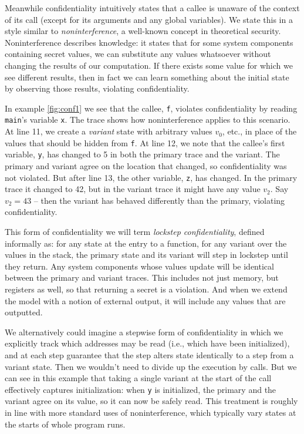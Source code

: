 \documentclass[acmsmall,review,anonymous]{acmart}\settopmatter{printfolios=true,printccs=false,printacmref=false}
\begin{document}
Meanwhile confidentiality intuitively states that a callee is unaware
of the context of its call (except for its arguments and any global variables).
We state this in a style similar to {\em noninterference}, a well-known concept in theoretical
security. Noninterference describes knowledge: it states that for some system components
containing secret values, we can substitute any values whatsoever without changing the results
of our computation. If there exists some value for which we see different results, then
in fact we can learn something about the initial state by observing those results, violating
confidentiality.

In example \ref{fig:conf1} we see that the callee, {\tt f}, violates confidentiality
by reading {\tt main}'s variable {\tt x}. The trace
shows how noninterference applies to this scenario. At line 11, we create a {\em variant}
state with arbitrary values \(v_0\), etc., in place of the values that should
be hidden from {\tt f}. At line 12, we note that the callee's first variable, {\tt y}, has
changed to 5 in both the primary trace and the variant. The primary and variant agree on
the location that changed, so confidentiality was not violated. But after line 13,
the other variable, {\tt z}, has changed. In the primary trace it changed to 42, but
in the variant trace it might have any value \(v_2\). Say \(v_2 = 43\) -- then the variant
has behaved differently than the primary, violating confidentiality.

This form of confidentiality we will term {\em lockstep confidentiality}, defined informally
as: for any state at the entry to a function, for any variant over the values in the stack,
the primary state and its variant will step in lockstep until they return. Any system components
whose values update will be identical between the primary and variant traces. This includes not
just memory, but registers as well, so that returning a secret is a violation. And when we
extend the model with a notion of external output, it will include any values that are
outputted.

We alternatively could imagine a stepwise form of confidentiality in which we explicitly
track which addresses may be read (i.e., which have been initialized), and at each step
guarantee that the step alters state identically to a step from a variant state. Then we
wouldn't need to divide up the execution by calls. But we can see in this example that taking
a single variant at the start of the call effectively captures initialization: when {\tt y} is
initialized, the primary and the variant agree on its value, so it can now be safely read.
This treatment is roughly in line with more standard uses of noninterference, which typically
vary states at the starts of whole program runs.
\end{document}
